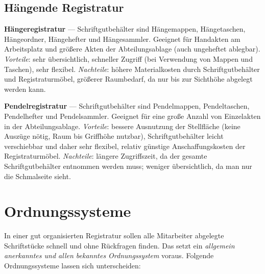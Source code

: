 \documentclass[11pt, a4paper]{article}
\begin{document}
\subsection{Hängende Registratur}

\textbf{Hängeregistratur} --- Schriftgutbehälter sind Hängemappen, Hängetaschen,
Hängeordner, Hängehefter und Hängesammler. Geeignet für Handakten am Arbeitsplatz und
größere Akten der Abteilungsablage (auch ungeheftet ablegbar). \emph{Vorteile}: sehr
übersichtlich, schneller Zugriff (bei Verwendung von Mappen und Taschen), sehr flexibel.
\emph{Nachteile}: höhere Materialkosten durch Schriftgutbehälter und Registraturmöbel,
größerer Raumbedarf, da nur bis zur Sichthöhe abgelegt werden kann.

\textbf{Pendelregistratur} --- Schriftgutbehälter sind Pendelmappen, Pendeltaschen,
Pendelhefter und Pendelsammler. Geeignet für eine große Anzahl von Einzelakten in der
Abteilungsablage. \emph{Vorteile}: bessere Ausnutzung der Stellfläche (keine Auszüge
nötig, Raum bis Griffhöhe nutzbar), Schriftgutbehälter leicht verschiebbar und daher
sehr flexibel, relativ günstige Anschaffungskosten der Registraturmöbel.
\emph{Nachteile}: längere Zugriffszeit, da der gesamte Schriftgutbehälter entnommen
werden muss; weniger übersichtlich, da man nur die Schmalseite sieht.

\section{Ordnungssysteme}

In einer gut organisierten Registratur sollen alle Mitarbeiter abgelegte Schriftstücke
schnell und ohne Rückfragen finden. Das setzt ein \emph{allgemein anerkanntes und allen
bekanntes Ordnungssystem} voraus. Folgende Ordnungssysteme lassen sich unterscheiden:
\end{document}
